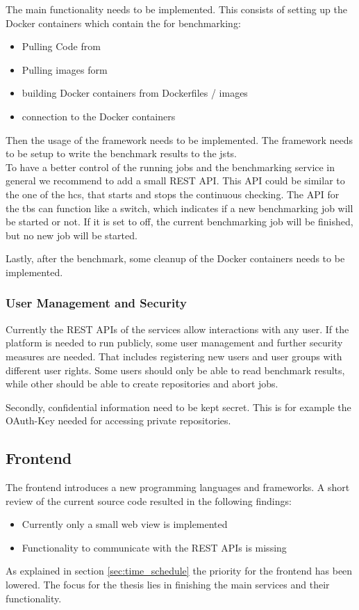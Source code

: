 The main functionality needs to be implemented.
This consists of setting up the Docker containers which contain the \tsp{} for benchmarking:

\begin{itemize}
	\item Pulling Code from \gh{}
	\item Pulling images form \dockh{}
	
	\item building Docker containers from Dockerfiles / images
	
	\item connection to the Docker containers
\end{itemize}

Then the usage of the \iguana{} framework needs to be implemented.
The framework needs to be setup to write the benchmark results to the \acl{jsts}.
\\

To have a better control of the running jobs and the benchmarking service in general we recommend to add a small REST API.
This API could be similar to the one of the \ac{hcs}, that starts and stops the continuous checking.
The API for the \ac{tbs} can function like a switch, which indicates if a new benchmarking job will be started or not.
If it is set to off, the current benchmarking job will be finished, but no new job will be started.

Lastly, after the benchmark, some cleanup of the Docker containers needs to be implemented.

\subsubsection{User Management and Security}
\label{sec:review_user_management}
Currently the REST APIs of the services allow interactions with any user.
If the platform is needed to run publicly, some user management and further security measures are needed.
That includes registering new users and user groups with different user rights.
Some users should only be able to read benchmark results, while other should be able to create repositories and abort jobs.

Secondly, confidential information need to be kept secret.
This is for example the OAuth-Key needed for accessing private \gh{} repositories.


\subsection{Frontend}
\label{sec:review_frontend}
The frontend introduces a new programming languages and frameworks.
A short review of the current source code resulted in the following findings:
\begin{itemize}
	\item Currently only a small web view is implemented
	\item Functionality to communicate with the REST APIs is missing
\end{itemize}


As explained in section \ref{sec:time_schedule} the priority for the frontend has been lowered.
The focus for the thesis lies in finishing the main services and their functionality.

